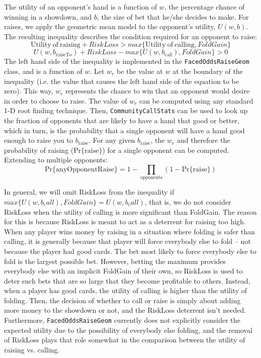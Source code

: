 The utility of an opponent's hand is a function of $w$, the percentage chance of winning in a showdown, and $b$, the size of bet that he/she decides to make.
For raises, we apply the geometric mean model to the opponent's utility, $U(w,b)$.
The resulting inequality describes the condition required for an opponent to raise:
\[
\mathrm{Utility\:of\:raising} + RiskLoss > max\{\mathrm{Utility\:of\:calling}, FoldGain\}
\]
\[
U(w,b_{\mathrm{raiseTo}}) + RiskLoss - max\{U(w,b_{\mathrm{call}}), FoldGain\} > 0
\]
The left hand side of the inequality is implemented in the \texttt{FacedOddsRaiseGeom} class, and is a function of $w$.
Let $w_r$ be the value at $w$ at the boundary of the inequality (i.e. the value that causes the left hand side of the equation to be zero).
This way, $w_r$ represents the chance to win that an opponent would desire in order to choose to raise.
The value of $w_r$ can be computed using any standard 1-D root finding technique.
Then, \texttt{CommunityCallStats} can be used to look up the fraction of opponents that are likely to have a hand that good or better, which in turn, is the probability that a single opponent will have a hand good enough to raise you to $b_{\mathrm{raise}}$.
For any given $b_{\mathrm{raise}}$, the $w_r$ and therefore the probability of raising ($\mathrm{Pr\{raise\}}$) for a single opponent can be computed.
Extending to multiple opponents:
\[
\mathrm{Pr\{anyOpponentRaise\}} = 1 - \prod_{\mathrm{opponents}} \left( 1 - \mathrm{Pr\{raise\}} \right)
\]


In general, we will omit RiskLoss from the inequality if $max\{U(w,b_call), FoldGain\} = U(w,b_call)$, that is, we do not consider RiskLoss when the utility of calling is more significant than FoldGain.
The reason for this is because RiskLoss is meant to act as a deterrent for raising too high.
When any player wins money by raising in a situation where folding is safer than calling, it is generally because that player will force everybody else to fold -- not because the player had good cards.
The bet most likely to force everybody else to fold is the largest possible bet.
However, betting the maximum provides everybody else with an implicit FoldGain of their own, so RiskLoss is used to deter such bets that are so large that they become profitable to others.
Instead, when a player has good cards, the utility of calling is higher than the utility of folding.
Then, the decision of whether to call or raise is simply about adding more money to the showdown or not, and the RiskLoss deterrent isn't needed.
Furthermore, \texttt{FacedOddsRaiseGeom} currently does not explicitly consider the expected utility due to the possibility of everybody else folding, and the removal of RiskLoss plays that role somewhat in the comparison between the utility of raising vs. calling.

